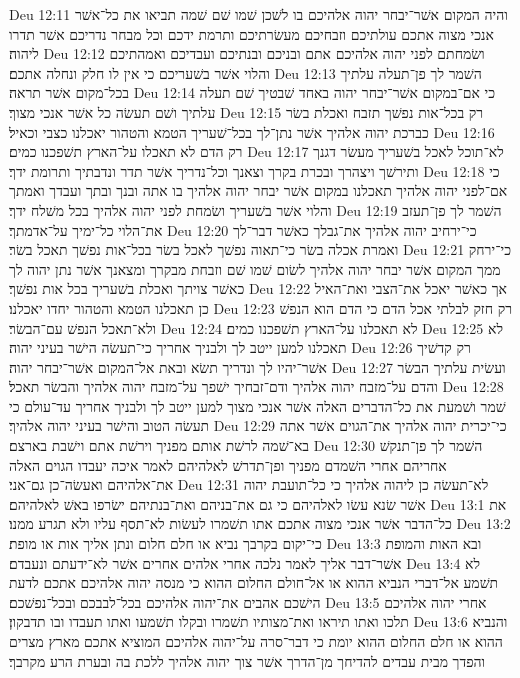 Deu 12:11  והיה המקום אשׁר־יבחר יהוה אלהיכם בו לשׁכן שׁמו שׁם שׁמה תביאו את כל־אשׁר אנכי מצוה אתכם עולתיכם וזבחיכם מעשׂרתיכם ותרמת ידכם וכל מבחר נדריכם אשׁר תדרו ליהוה׃
Deu 12:12  ושׂמחתם לפני יהוה אלהיכם אתם ובניכם ובנתיכם ועבדיכם ואמהתיכם והלוי אשׁר בשׁעריכם כי אין לו חלק ונחלה אתכם׃
Deu 12:13  השׁמר לך פן־תעלה עלתיך בכל־מקום אשׁר תראה׃
Deu 12:14  כי אם־במקום אשׁר־יבחר יהוה באחד שׁבטיך שׁם תעלה עלתיך ושׁם תעשׂה כל אשׁר אנכי מצוך׃
Deu 12:15  רק בכל־אות נפשׁך תזבח ואכלת בשׂר כברכת יהוה אלהיך אשׁר נתן־לך בכל־שׁעריך הטמא והטהור יאכלנו כצבי וכאיל׃
Deu 12:16  רק הדם לא תאכלו על־הארץ תשׁפכנו כמים׃
Deu 12:17  לא־תוכל לאכל בשׁעריך מעשׂר דגנך ותירשׁך ויצהרך ובכרת בקרך וצאנך וכל־נדריך אשׁר תדר ונדבתיך ותרומת ידך׃
Deu 12:18  כי אם־לפני יהוה אלהיך תאכלנו במקום אשׁר יבחר יהוה אלהיך בו אתה ובנך ובתך ועבדך ואמתך והלוי אשׁר בשׁעריך ושׂמחת לפני יהוה אלהיך בכל משׁלח ידך׃
Deu 12:19  השׁמר לך פן־תעזב את־הלוי כל־ימיך על־אדמתך׃
Deu 12:20  כי־ירחיב יהוה אלהיך את־גבלך כאשׁר דבר־לך ואמרת אכלה בשׂר כי־תאוה נפשׁך לאכל בשׂר בכל־אות נפשׁך תאכל בשׂר׃
Deu 12:21  כי־ירחק ממך המקום אשׁר יבחר יהוה אלהיך לשׂום שׁמו שׁם וזבחת מבקרך ומצאנך אשׁר נתן יהוה לך כאשׁר צויתך ואכלת בשׁעריך בכל אות נפשׁך׃
Deu 12:22  אך כאשׁר יאכל את־הצבי ואת־האיל כן תאכלנו הטמא והטהור יחדו יאכלנו׃
Deu 12:23  רק חזק לבלתי אכל הדם כי הדם הוא הנפשׁ ולא־תאכל הנפשׁ עם־הבשׂר׃
Deu 12:24  לא תאכלנו על־הארץ תשׁפכנו כמים׃
Deu 12:25  לא תאכלנו למען ייטב לך ולבניך אחריך כי־תעשׂה הישׁר בעיני יהוה׃
Deu 12:26  רק קדשׁיך אשׁר־יהיו לך ונדריך תשׂא ובאת אל־המקום אשׁר־יבחר יהוה׃
Deu 12:27  ועשׂית עלתיך הבשׂר והדם על־מזבח יהוה אלהיך ודם־זבחיך ישׁפך על־מזבח יהוה אלהיך והבשׂר תאכל׃
Deu 12:28  שׁמר ושׁמעת את כל־הדברים האלה אשׁר אנכי מצוך למען ייטב לך ולבניך אחריך עד־עולם כי תעשׂה הטוב והישׁר בעיני יהוה אלהיך׃
Deu 12:29  כי־יכרית יהוה אלהיך את־הגוים אשׁר אתה בא־שׁמה לרשׁת אותם מפניך וירשׁת אתם וישׁבת בארצם׃
Deu 12:30  השׁמר לך פן־תנקשׁ אחריהם אחרי השׁמדם מפניך ופן־תדרשׁ לאלהיהם לאמר איכה יעבדו הגוים האלה את־אלהיהם ואעשׂה־כן גם־אני׃
Deu 12:31  לא־תעשׂה כן ליהוה אלהיך כי כל־תועבת יהוה אשׁר שׂנא עשׂו לאלהיהם כי גם את־בניהם ואת־בנתיהם ישׂרפו באשׁ לאלהיהם׃
Deu 13:1  את כל־הדבר אשׁר אנכי מצוה אתכם אתו תשׁמרו לעשׂות לא־תסף עליו ולא תגרע ממנו׃
Deu 13:2  כי־יקום בקרבך נביא או חלם חלום ונתן אליך אות או מופת׃
Deu 13:3  ובא האות והמופת אשׁר־דבר אליך לאמר נלכה אחרי אלהים אחרים אשׁר לא־ידעתם ונעבדם׃
Deu 13:4  לא תשׁמע אל־דברי הנביא ההוא או אל־חולם החלום ההוא כי מנסה יהוה אלהיכם אתכם לדעת הישׁכם אהבים את־יהוה אלהיכם בכל־לבבכם ובכל־נפשׁכם׃
Deu 13:5  אחרי יהוה אלהיכם תלכו ואתו תיראו ואת־מצותיו תשׁמרו ובקלו תשׁמעו ואתו תעבדו ובו תדבקון׃
Deu 13:6  והנביא ההוא או חלם החלום ההוא יומת כי דבר־סרה על־יהוה אלהיכם המוציא אתכם מארץ מצרים והפדך מבית עבדים להדיחך מן־הדרך אשׁר צוך יהוה אלהיך ללכת בה ובערת הרע מקרבך׃
